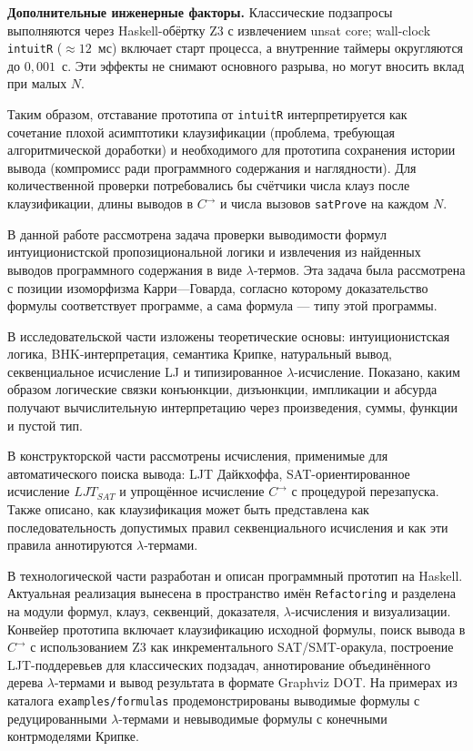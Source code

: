 \documentclass[14pt, russian]{scrartcl}
\begin{document}
\textbf{Дополнительные инженерные факторы.} Классические подзапросы
  выполняются через Haskell-обёртку Z3 с извлечением unsat core; wall-clock
  \texttt{intuitR} ($\approx 12$~мс) включает старт процесса, а внутренние
  таймеры округляются до $0{,}001$~с. Эти эффекты не снимают основного разрыва,
  но могут вносить вклад при малых $N$.

Таким образом, отставание прототипа от \texttt{intuitR} интерпретируется как
сочетание плохой асимптотики клаузификации (проблема, требующая алгоритмической
доработки) и необходимого для прототипа сохранения истории вывода (компромисс
ради программного содержания и наглядности). Для количественной проверки
потребовались бы счётчики числа клауз после клаузификации, длины выводов в
$C^{\rightarrow}$ и числа вызовов \texttt{satProve} на каждом $N$.


В данной работе рассмотрена задача проверки выводимости формул
интуиционистской пропозициональной логики и извлечения из найденных выводов
программного содержания в виде $\lambda$-термов. Эта задача была рассмотрена с
позиции изоморфизма Карри---Говарда, согласно которому доказательство формулы
соответствует программе, а сама формула --- типу этой программы.

В исследовательской части изложены теоретические основы: интуиционистская
логика, BHK-интерпретация, семантика Крипке, натуральный вывод, секвенциальное
исчисление LJ и типизированное $\lambda$-исчисление. Показано, каким образом
логические связки конъюнкции, дизъюнкции, импликации и абсурда получают
вычислительную интерпретацию через произведения, суммы, функции и пустой тип.

В конструкторской части рассмотрены исчисления, применимые для автоматического
поиска вывода: LJT Дайкхоффа, SAT-ориентированное исчисление $LJT_{SAT}$ и
упрощённое исчисление $C^{\rightarrow}$ с процедурой перезапуска. Также
описано, как клаузификация может быть представлена как последовательность
допустимых правил секвенциального исчисления и как эти правила аннотируются
$\lambda$-термами.

В технологической части разработан и описан программный прототип на Haskell.
Актуальная реализация вынесена в пространство имён \texttt{Refactoring} и
разделена на модули формул, клауз, секвенций, доказателя, $\lambda$-исчисления
и визуализации. Конвейер прототипа включает клаузификацию исходной формулы,
поиск вывода в $C^{\rightarrow}$ с использованием Z3 как инкрементального
SAT/SMT-оракула, построение LJT-поддеревьев для классических подзадач,
аннотирование объединённого дерева $\lambda$-термами и вывод результата в
формате Graphviz DOT. На примерах из каталога \texttt{examples/formulas}
продемонстрированы выводимые формулы с редуцированными $\lambda$-термами и
невыводимые формулы с конечными контрмоделями Крипке.
\end{document}
